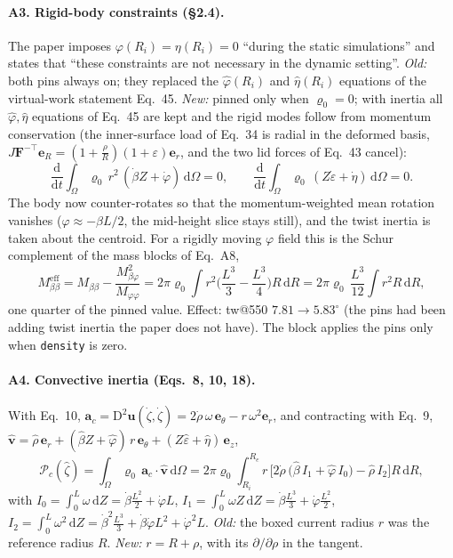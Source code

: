 \documentclass[10pt]{article}
\begin{document}
\paragraph{A3. Rigid-body constraints (\S2.4).} The paper imposes $\varphi(R_i)=\eta(R_i)=0$
``during the static simulations'' and states that ``these constraints are not necessary in the
dynamic setting''. \emph{Old:} both pins always on; they replaced the $\hat\varphi(R_i)$ and
$\hat\eta(R_i)$ equations of the virtual-work statement Eq.~45. \emph{New:} pinned only when
$\varrho_0=0$; with inertia all $\hat\varphi,\hat\eta$ equations of Eq.~45 are kept and the rigid
modes follow from momentum conservation (the inner-surface load of Eq.~34 is radial in the
deformed basis, $J\boldsymbol F^{-\top}\boldsymbol e_R=(1{+}\tfrac\rho R)(1{+}\varepsilon)\boldsymbol e_r$,
and the two lid forces of Eq.~43 cancel):
\begin{equation*}
\frac{\mathrm d}{\mathrm dt}\int_\Omega\varrho_0\,r^2\,(\dot\beta Z+\dot\varphi)\,\mathrm d\Omega=0,
\qquad
\frac{\mathrm d}{\mathrm dt}\int_\Omega\varrho_0\,(Z\dot\varepsilon+\dot\eta)\,\mathrm d\Omega=0 .
\end{equation*}
The body now counter-rotates so that the momentum-weighted mean rotation vanishes
($\varphi\approx-\beta L/2$, the mid-height slice stays still), and the twist inertia is taken
about the centroid. For a rigidly moving $\varphi$ field this is the Schur complement of the
mass blocks of Eq.~A8,
\begin{equation*}
M_{\beta\beta}^\text{eff}=M_{\beta\beta}-\frac{M_{\beta\varphi}^2}{M_{\varphi\varphi}}
=2\pi\varrho_0\!\int r^2\Big(\frac{L^3}{3}-\frac{L^3}{4}\Big)R\,\mathrm dR
=2\pi\varrho_0\,\frac{L^3}{12}\!\int r^2R\,\mathrm dR ,
\end{equation*}
one quarter of the pinned value. Effect: tw@550 $7.81\to5.83^\circ$ (the pins had been adding
twist inertia the paper does not have). The block applies the pins only when
\texttt{density} is zero.

\paragraph{A4. Convective inertia (Eqs.~8, 10, 18).} With Eq.~10,
$\boldsymbol a_c=\mathrm D^2\boldsymbol u(\dot\zeta,\dot\zeta)=2\dot\rho\,\omega\,\boldsymbol e_\theta-r\,\omega^2\boldsymbol e_r$,
and contracting with Eq.~9,
$\hat{\boldsymbol v}=\hat\rho\,\boldsymbol e_r+(\hat\beta Z+\hat\varphi)\,r\,\boldsymbol e_\theta+(Z\hat\varepsilon+\hat\eta)\,\boldsymbol e_z$,
\begin{equation*}
\mathcal P_c(\hat\zeta)=\int_\Omega\varrho_0\,\boldsymbol a_c\cdot\hat{\boldsymbol v}\,\mathrm d\Omega
=2\pi\varrho_0\int_{R_i}^{R_e}\boxed{r}\,\Big[2\dot\rho\,\big(\hat\beta\,I_1+\hat\varphi\,I_0\big)-\hat\rho\,I_2\Big]R\,\mathrm dR,
\end{equation*}
with $I_0=\int_0^L\omega\,\mathrm dZ=\dot\beta\frac{L^2}{2}+\dot\varphi L$,
$I_1=\int_0^L\omega Z\,\mathrm dZ=\dot\beta\frac{L^3}{3}+\dot\varphi\frac{L^2}{2}$,
$I_2=\int_0^L\omega^2\,\mathrm dZ=\dot\beta^2\frac{L^3}{3}+\dot\beta\dot\varphi L^2+\dot\varphi^2L$.
\emph{Old:} the boxed current radius $r$ was the reference radius $R$. \emph{New:} $r=R+\rho$,
with its $\partial/\partial\rho$ in the tangent.
\end{document}
